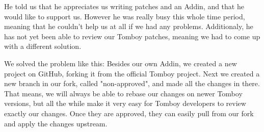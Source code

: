 He told us that he appreciates us writing patches and an Addin, and that he would like to support us. However he was really busy this whole time period, meaning that he couldn't help us at all if we had any problems. Additionaly, he has not yet been able to review our Tomboy patches, meaning we had to come up with a different solution.

We solved the problem like this: Besides our own Addin, we created a new project on GitHub, forking it from the official Tomboy project. Next we created a new branch in our fork, called "non-approved", and made all the changes in there. That means, we will always be able to rebase our changes on newer Tomboy versions, but all the while make it very easy for Tomboy developers to review exactly our changes. Once they are approved, they can easily pull from our fork and apply the changes upstream.